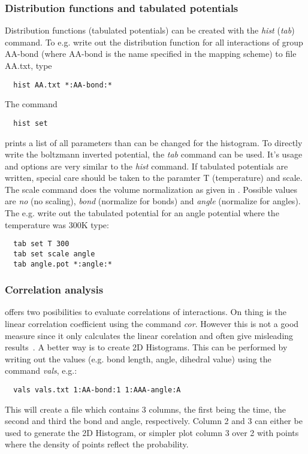 \subsubsection{Distribution functions and tabulated potentials}
Distribution functions (tabulated potentials) can be created with the \textit{hist} (\textit{tab}) command.
To e.g. write out the distribution function for all interactions of group AA-bond (where AA-bond is the name specified in the mapping scheme) to file AA.txt, type
\begin{verbatim}
  hist AA.txt *:AA-bond:*   
\end{verbatim}
The command
\begin{verbatim}
  hist set
\end{verbatim}
prints a list of all parameters than can be changed for the histogram. To directly write the boltzmann inverted potential, the \textit{tab} command can be used. It's usage and options are very similar to the \textit{hist} command. If tabulated potentials are written, special care should be taken to the paramter T (temperature) and scale. The scale command does the volume normalization as given in . Possible values are \textit{no} (no scaling), \textit{bond} (normalize for bonds) and \textit{angle} (normalize for angles). The e.g. write out the tabulated potential for an angle potential where the temperature was 300K type:
\begin{verbatim}
  tab set T 300
  tab set scale angle
  tab angle.pot *:angle:*
\end{verbatim}

\subsubsection{Correlation analysis}
 offers two posibilities to evaluate correlations of interactions. On thing is the linear correlation coefficient using the command \textit{cor}. However this is not a good measure since it only calculates the linear corelation and often give misleading results~\cite{Ruehle:2009.a}. A better way is to create 2D Histograms. This can be performed by writing out the values (e.g. bond length, angle, dihedral value) using the command \textit{vals}, e.g.:
\begin{verbatim}
  vals vals.txt 1:AA-bond:1 1:AAA-angle:A
\end{verbatim}
This will create a file which contains 3 columns, the first being the time, the second and third the bond and angle, respectively. Column 2 and 3 can either be used to generate the 2D Histogram, or simpler plot column 3 over 2 with points where the density of points reflect the probability.
